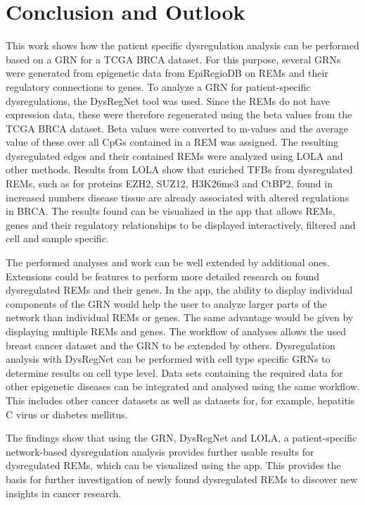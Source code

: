 \documentclass[pdftex,12pt,a4paper]{report}
\begin{document}
\chapter{Conclusion and Outlook}
This work shows how the patient specific dysregulation analysis can be performed based on a GRN for a TCGA BRCA dataset\cite{tcga}. For this purpose, several GRNs were generated from epigenetic data from EpiRegioDB on REMs and their regulatory connections to genes. To analyze a GRN for patient-specific dysregulations, the DysRegNet tool was used. Since the REMs do not have expression data, these were therefore regenerated using the beta values from the TCGA BRCA dataset. Beta values were converted to m-values and the average value of these over all CpGs contained in a REM was assigned. The resulting dysregulated edges and their contained REMs were analyzed using LOLA and other methods. Results from LOLA show that enriched TFBs from dysregulated REMs, such as for proteins EZH2, SUZ12, H3K26me3 and CtBP2, found in increased numbers disease tissue are already associated with altered regulations in BRCA. The results found can be visualized in the app that allows REMs, genes and their regulatory relationships to be displayed interactively, filtered and cell and sample specific.

The performed analyses and work can be well extended by additional ones. Extensions could be features to perform more detailed research on found dysregulated REMs and their genes. In the app, the ability to display individual components of the GRN would help the user to analyze larger parts of the network than individual REMs or genes. The same advantage would be given by displaying multiple REMs and genes.
The workflow of analyses allows the used breast cancer dataset and the GRN to be extended by others. 
Dysregulation analysis with DysRegNet can be performed with cell type specific GRNs to determine results on cell type level. Data sets containing the required data for other epigenetic diseases can be  integrated and analysed using the same workflow. This includes other cancer datasets as well as datasets for, for example, hepatitis C virus or diabetes mellitus.

The findings show that using the GRN, DysRegNet and LOLA, a patient-specific network-based dysregulation analysis provides further usable results for dysregulated REMs, which can be visualized using the app. This provides the basis for further investigation of newly found dysregulated REMs to discover new insights in cancer research.
\end{document}
